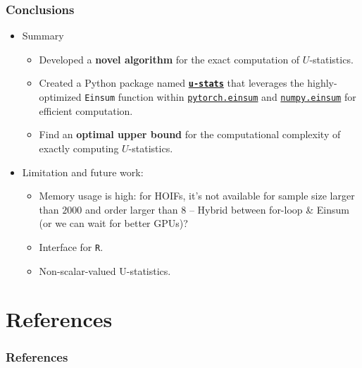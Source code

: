 \documentclass[9pt]{beamer}
\theoremstyle{mystyle}
\theoremstyle{mystyletwo}
\newcommand{\libref}[2]{\href{#2}{\texttt{#1}}}
\def\package{\libref{u-stats}{https://github.com/Amedar-Asterisk/U-Statistics-python}}
\newcommand{\numpyeinsum}{\libref{numpy.einsum}{https://numpy.org/doc/2.1/reference/generated/numpy.einsum.html}}
\newcommand{\torcheinsum}{\libref{pytorch.einsum}{https://pytorch.org/docs/stable/generated/torch.einsum.html}}
\begin{document}
\begin{frame}
    \frametitle{Conclusions}
    \begin{itemize}
    \item Summary 
    \begin{itemize}
        \setlength\itemsep{1.5em}

        \item Developed a \textbf{novel algorithm} for the exact computation of $U$-statistics.
        
        \item Created a Python package named \textbf{\package{}} that leverages the highly-optimized \texttt{Einsum} function within \torcheinsum{} and \numpyeinsum{} for efficient computation.
    

        \item Find an \textbf{optimal upper bound} for the computational complexity of exactly computing $U$-statistics.
    \end{itemize}
                   
    \setlength\itemsep{1.5em}
        \item Limitation and future work:
              \begin{itemize}
              \setlength\itemsep{1.5em}
                  \item Memory usage is high: for HOIFs, it's not available for sample size larger than $2000$ and order larger than $8$ -- Hybrid between for-loop \& Einsum (or we can wait for better GPUs)?

                  \item Interface for \texttt{R}.
                  \item Non-scalar-valued U-statistics.
              \end{itemize}
    \end{itemize}
\end{frame}

\section*{References}
\begin{frame}
    \frametitle{References}
    
\end{frame}
\end{document}
